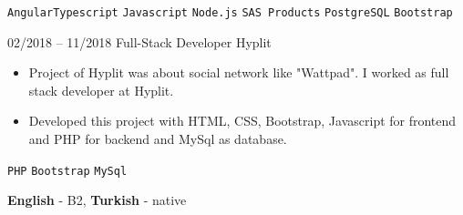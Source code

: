 \documentclass[9pt]{developercv} %
\begin{document}
\begin{entrylist}
{\begin{itemize}[noitemsep,topsep=0pt,parsep=0pt,partopsep=0pt, leftmargin=-1pt]
        \end{itemize} 
        \texttt{Angular}\slashsep \texttt{Typescript} \slashsep \texttt{Javascript} \slashsep \texttt{Node.js} \slashsep \texttt{SAS Products} \slashsep \texttt{PostgreSQL} \slashsep \texttt{Bootstrap} }
	\entry
		{02/2018 -- 11/2018 }
		{Full-Stack Developer}
		{Hyplit}
		{\vspace{-10pt}
        \begin{itemize}[noitemsep,topsep=0pt,parsep=0pt,partopsep=0pt, leftmargin=-1pt]
            \item { Project of Hyplit was about social network like "Wattpad". I worked as full stack developer at Hyplit. }
            \item { Developed this project with HTML, CSS, Bootstrap, Javascript for frontend and PHP  for backend and MySql as database. }
        \end{itemize} 
        \texttt{PHP} \slashsep \texttt{Bootstrap} \slashsep \texttt{MySql}}
\end{entrylist}

\vspace{-10 pt}
    \vspace{-6pt}
    
    \hspace{26mm} \textbf{English} - B2, \textbf{ Turkish} - native

\end{document}
